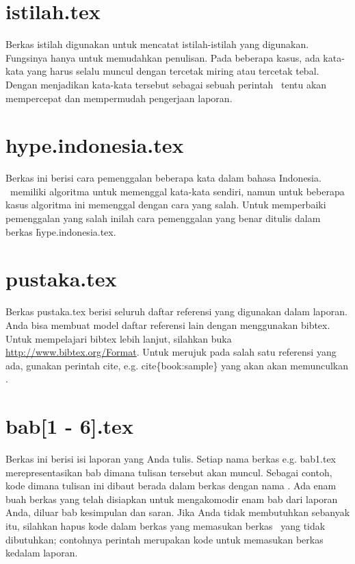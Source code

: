 \section{istilah.tex}
Berkas istilah digunakan untuk mencatat istilah-istilah yang digunakan.
Fungsinya hanya untuk memudahkan penulisan.
Pada beberapa kasus, ada kata-kata yang harus selalu muncul dengan tercetak miring atau tercetak tebal.
Dengan menjadikan kata-kata tersebut sebagai sebuah perintah \latex~tentu akan mempercepat dan mempermudah pengerjaan laporan.


\section{hype.indonesia.tex}
Berkas ini berisi cara pemenggalan beberapa kata dalam bahasa Indonesia.
\latex~memiliki algoritma untuk memenggal kata-kata sendiri, namun untuk beberapa kasus algoritma ini memenggal dengan cara yang salah.
Untuk memperbaiki pemenggalan yang salah inilah cara pemenggalan yang benar ditulis dalam berkas \f{hype.indonesia.tex}.


\section{pustaka.tex}
Berkas pustaka.tex berisi seluruh daftar referensi yang digunakan dalam
laporan.
Anda bisa membuat model daftar referensi lain dengan menggunakan bibtex.
Untuk mempelajari bibtex lebih lanjut, silahkan buka \url{http://www.bibtex.org/Format}.
Untuk merujuk pada salah satu referensi yang ada, gunakan perintah \bslash cite, e.g. \bslash cite\{book:sample\} yang akan akan memunculkan \cite{book:sample}.


\section{bab[1 - 6].tex}
Berkas ini berisi isi laporan yang Anda tulis.
Setiap nama berkas e.g. bab1.tex merepresentasikan bab dimana tulisan tersebut akan muncul.
Sebagai contoh, kode dimana tulisan ini dibaut berada dalam berkas dengan nama .
Ada enam buah berkas yang telah disiapkan untuk mengakomodir enam bab dari laporan Anda, diluar bab kesimpulan dan saran.
Jika Anda tidak membutuhkan sebanyak itu, silahkan hapus kode dalam berkas  yang memasukan berkas \latex~yang tidak dibutuhkan; contohnya perintah  merupakan kode untuk memasukan berkas  kedalam laporan.

